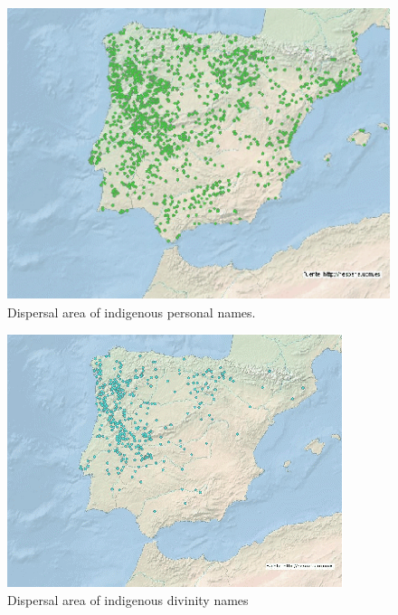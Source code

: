 \documentclass[amsthm,ebook]{saparticle}
\begin{document}
\begin{figure}[!hbp]
\centering
 \includegraphics[width=\columnwidth]{EpigraphyandonomasticsinHesperiadatabanktemplate-img005.png}
\caption{Dispersal area of indigenous personal names.}
\label{fig:5}
\end{figure}


\begin{figure}[!hbp]
\centering
 \includegraphics[width=\columnwidth]{EpigraphyandonomasticsinHesperiadatabanktemplate-img006.png}
\caption{Dispersal area of indigenous divinity names}
\label{fig:6}
\end{figure}
\end{document}
